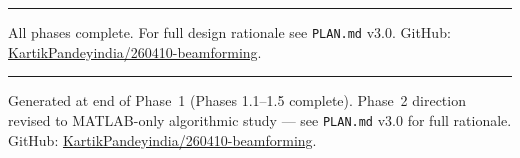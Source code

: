 \documentclass[11pt,a4paper]{article}
\begin{document}
\vspace{0.5em}\hrule\vspace{0.5em}
{\small\color{neutralgray}
All phases complete. For full design rationale see \texttt{PLAN.md} v3.0.
GitHub: \href{https://github.com/KartikPandeyindia/260410-beamforming}{KartikPandeyindia/260410-beamforming}.}

\vspace{1em}\hrule\vspace{0.5em}
{\small\color{neutralgray}
Generated at end of Phase~1 (Phases 1.1--1.5 complete). Phase~2 direction
revised to MATLAB-only algorithmic study --- see \texttt{PLAN.md} v3.0
for full rationale.
GitHub: \href{https://github.com/KartikPandeyindia/260410-beamforming}{KartikPandeyindia/260410-beamforming}.}
\end{document}
